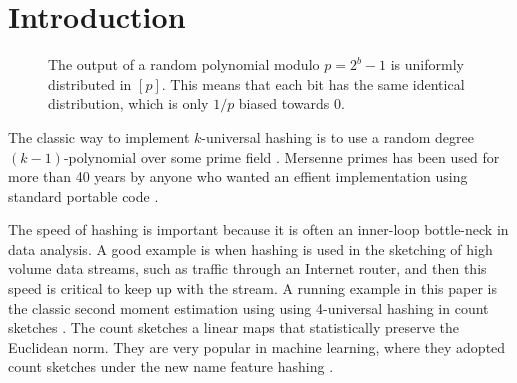 \section{Introduction}

\begin{figure}
   \centering
   \caption{The output of a random polynomial modulo $p=2^b-1$ is uniformly distributed in $[p]$. This means that each bit has the same identical distribution, which is only $1/p$ biased towards 0.}
   \label{fig:bits}
\end{figure}

The classic way to implement $k$-universal hashing is to use a random
degree $(k-1)$-polynomial over some prime field
\cite{wegman81kwise}. Mersenne primes has been used for more than 40
years by anyone who
wanted an effient implementation
using standard portable code \cite{carter77universal}.

The speed of hashing is important because it is often an inner-loop
bottle-neck in data analysis. A good example is when hashing is used
in the sketching of high volume data streams, such as traffic through
an Internet router, and then this speed is critical to keep up with
the stream. A running example in this paper is the classic second
moment estimation using using 4-universal hashing in count sketches
\cite{charikar04count-sketch}. The count sketches a linear maps that
statistically preserve the Euclidean norm. They are very popular in
machine learning, where they adopted count sketches under the new name
feature hashing \cite{WDLSA09}.

